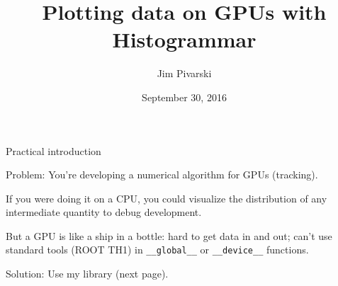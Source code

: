 \documentclass{beamer}
\title[2016-10-30-histogrammar-cuda]{Plotting data on GPUs with Histogrammar}
\author{Jim Pivarski}
\institute{Princeton -- DIANA}
\date{September 30, 2016}
\begin{document}

\begin{frame}
  \titlepage
\end{frame}



\begin{frame}{Practical introduction}

\begin{block}{Problem:}
\vspace{0.25 cm}
You're developing a numerical algorithm for GPUs (tracking).

\vspace{0.25 cm}
If you were doing it on a CPU, you could visualize the distribution of any intermediate quantity to debug development.

\vspace{0.25 cm}
But a GPU is like a ship in a bottle: hard to get data in and out; can't use standard tools (ROOT TH1) in {\tt \_\_global\_\_} or {\tt \_\_device\_\_} functions.
\end{block}

\vspace{0.25 cm}
\begin{block}{Solution:}
\vspace{0.25 cm}
Use my library (next page).
\end{block}
\end{frame}
\end{document}
